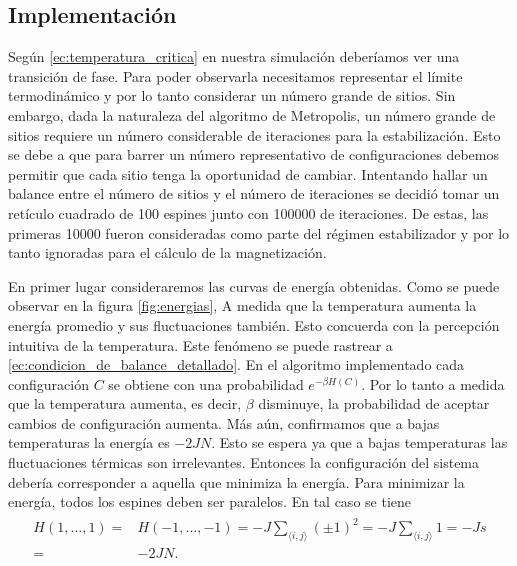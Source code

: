 \documentclass{article}
\begin{document}
\subsection{Implementación}

Según \eqref{ec:temperatura_critica} en nuestra simulación deberíamos ver una transición de fase. Para poder observarla necesitamos representar el límite termodinámico y por lo tanto considerar un número grande de sitios. Sin embargo, dada la naturaleza del algoritmo de Metropolis, un número grande de sitios requiere un número considerable de iteraciones para la estabilización. Esto se debe a que para barrer un número representativo de configuraciones debemos permitir que cada sitio tenga la oportunidad de cambiar. Intentando hallar un balance entre el número de sitios y el número de iteraciones se decidió tomar un retículo cuadrado de 100 espines junto con 100000 de iteraciones. De estas, las primeras 10000 fueron consideradas como parte del régimen estabilizador y por lo tanto ignoradas para el cálculo de la magnetización.

En primer lugar consideraremos las curvas de energía obtenidas. Como se puede observar en la figura \ref{fig:energias}, A medida que la temperatura aumenta la energía promedio y sus fluctuaciones también. Esto concuerda con la percepción intuitiva de la temperatura. Este fenómeno se puede rastrear a \eqref{ec:condicion_de_balance_detallado}. En el algoritmo implementado cada configuración $C$ se obtiene con una probabilidad $e^{-\beta H(C)}$. Por lo tanto a medida que la temperatura aumenta, es decir, $\beta$ disminuye, la probabilidad de aceptar cambios de configuración aumenta. Más aún, confirmamos que a bajas temperaturas la energía es $-2JN$. Esto se espera ya que a bajas temperaturas las fluctuaciones térmicas son irrelevantes. Entonces la configuración del sistema debería corresponder a aquella que minimiza la energía. Para minimizar la energía, todos los espines deben ser paralelos. En tal caso se tiene
\begin{align}
\begin{split}
H(1,\dots,1)=&H(-1,\dots,-1)=-J\sum_{\langle i,j\rangle}(\pm 1)^2=-J\sum_{\langle i,j\rangle}1=-Js\\
=&-2JN.
\end{split}
\end{align}
\end{document}
